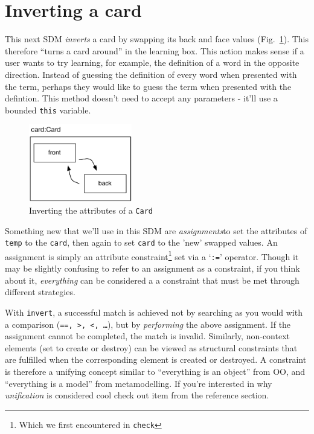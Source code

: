 \newpage
\hypertarget{sec:invertCard}{}
\section{Inverting a card}
\genHeader

This next SDM \emph{inverts} a card by swapping its back and face values (Fig.~\ref{fig:goal_invert}). This therefore ``turns a card around'' in the learning
box. This action makes sense if a user wants to try learning, for example, the definition of a word in the opposite direction. Instead of guessing the
definition of every word when presented with the term, perhaps they would like to guess the term when presented with the defintion. This method doesn't need to
accept any parameters - it'll use a bounded \texttt{this} variable.

\vspace{0.5cm}

\begin{figure}[htbp]
	\centering
    \includegraphics[width=0.4\textwidth]{goal_invert.pdf}
 	\caption{Inverting the attributes of a \texttt{Card}}
 	\label{fig:goal_invert}
\end{figure}
\FloatBarrier

Something new that we'll use in this SDM are \emph{assignments}to set the attributes of \texttt{temp} to the \texttt{card}, then again to
set \texttt{card} to the 'new' swapped values. An assignment is simply an attribute constraint\footnote{Which we first encountered in \texttt{check}} set via a
`\texttt{:=}' operator. Though it may be slightly confusing to refer to an assignment as a constraint, if you think about it, \emph{everything} can be
considered a a constraint that must be met through different strategies.

With \texttt{invert}, a successful match is achieved not by searching as you would with a comparison (\texttt{==, >, <, \ldots}), but by \emph{performing} the
above assignment. If the assignment cannot be completed, the match is invalid. Similarly, non-context elements (set to create or destroy) can be viewed as
structural constraints that are fulfilled when the corresponding element is created or destroyed.  A constraint is therefore a unifying concept similar to
``everything is an object'' from OO, and ``everything is a model'' from metamodelling.  If you're interested in why \emph{unification} is considered cool check
out item \cite{BEZ05} from the reference section.








